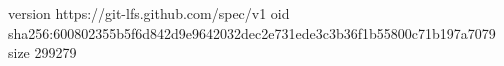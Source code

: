 version https://git-lfs.github.com/spec/v1
oid sha256:600802355b5f6d842d9e9642032dec2e731ede3c3b36f1b55800c71b197a7079
size 299279
